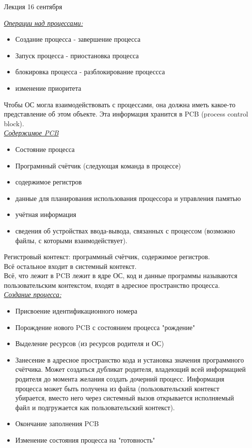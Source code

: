 \documentclass[12pt, a4paper]{article}
\begin{document}
    \begin{center}
        Лекция 16 сентября
    \end{center}
    \underline{\textit{Операции над процессами:}}
    \begin{itemize}
        \item Создание процесса - завершение процесса
        \item Запуск процесса - приостановка процесса
        \item блокировка процесса - разблокирование процессса 
        \item изменение приоритета
    \end{itemize}
    Чтобы ОС могла взаимодействовать с процессами, она должна иметь какое-то представление об этом объекте. Эта информация хранится в PCB (process control block).\\
    \underline{\textit{Содержимое PCB}}
    \begin{itemize}
        \item Состояние процесса
        \item Програмнный счётчик (следующая команда в процессе)
        \item содержимое регистров
        \item данные для планирования использования процессора и управления памятью
        \item учётная информация
        \item сведения об устройствах ввода-вывода, связанных с процессом (возможно файлы, с которыми взаимодействует).
    \end{itemize}
    Регистровый контекст: программный счётчик, содержимое регистров.\\
    Всё остальное входит в системный контекст.\\
    Всё, что лежит в PCB лежит в ядре ОС, код и данные программы называются пользовательским контекстом, входят в адресное пространство процесса.\\
    \underline{\textit{Создание процесса:}}
    \begin{itemize}
        \item Присвоение идентификационного номера
        \item Порождение нового PCB с состоянием процесса "рождение"
        \item Выделение ресурсов (из ресурсов родителя и ОС)
        \item Занесение в адресное пространство кода и установка значения программного счётчика. Может создаться дубликат родителя, владеющий всей информацией родителя до момента желания создать дочерний процесс. Информация процесса может быть получена из файла (пользовательский контекст убирается, вместо него через системный вызов открывается исполняемый файл и подгружается как пользовательский контекст).
        \item Окончание заполнения PCB
        \item Изменение состояния процесса на "готовность"
    \end{itemize}
\end{document}
